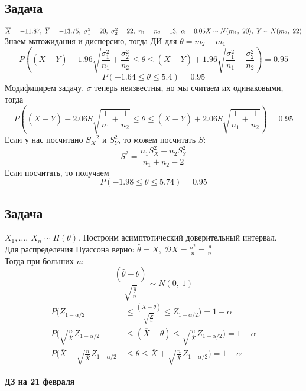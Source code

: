 \documentclass[12pt, a4paper]{article}
\newcommand{\dev}{\mathcal{D}}
\begin{document}
\subsection*{Задача}
$\overline{X} = -11.87,\ \overline{Y} = -13.75,\ \sigma_1^2 = 20,\ \sigma_2^2 = 22,\ n_1 = n_2 = 13,\ \alpha = 0.05\\
    X \sim N(m_1,\ 20),\ Y \sim N(m_2,\ 22)$
Знаем матожидания и дисперсию, тогда ДИ для $\theta = m_2 - m_1$
\[P \left( (\overline{X} - \overline{Y}) -1.96 \sqrt{\frac{\sigma_1^2}{n_1} + \frac{\sigma_2^2}{n_2}} \leq \theta \leq (\overline{X} - \overline{Y}) + 1.96 \sqrt{\frac{\sigma_1^2}{n_1} + \frac{\sigma_2^2}{n_2}} \right) = 0.95\]
\[P \left( -1.64 \leq \theta \leq 5.4 \right) = 0.95\]
Модифицирем задачу. $\sigma$ теперь неизвестны, но мы считаем их одинаковыми, тогда
\[P \left( (\overline{X} - \overline{Y}) -2.06 S \sqrt{\frac{1}{n_1} + \frac{1}{n_2}} \leq \theta \leq (\overline{X} - \overline{Y}) + 2.06 S \sqrt{\frac{1}{n_1} + \frac{1}{n_2}} \right) = 0.95\]
Если у нас посчитано ${S_{X}}^2$ и $S_Y^2$, то можем посчитать $S$:
\[S^2 = \frac{n_1 S_X^2 + n_2 S_Y^2}{n_1 + n_2 - 2}\]
Если посчитать, то получаем
\[P \left( -1.98 \leq \theta \leq 5.74 \right) = 0.95\]
\subsection*{Задача}
$X_1,\dots,\ X_n \sim \Pi(\theta)$. Построим асимптотический доверительный интервал.\\
Для распределения Пуассона верно: $\hat \theta = \overline{X},\ \dev \overline{X} = \frac{\sigma^2}{n} = \frac{\theta}{n}$\\
Тогда при больших $n$:
\[\frac{(\hat\theta - \theta)}{\sqrt{\frac{\hat\theta}{n}}} \sim N(0,\ 1)\]
\begin{equation*}
    \begin{aligned}
        P \Bigg( Z_{1 - \alpha/2}                                            & \,\leq  \frac{(\overline X - \theta)}{\sqrt{\frac{\overline X}{n}}} \leq Z_{1 - \alpha/2} \Bigg) = 1- \alpha \\
        P \Bigg( \sqrt{\frac{n}{\overline X}}Z_{1 - \alpha/2}                & \,\leq  {(\overline X - \theta)} \leq  \sqrt{\frac{n}{\overline X}}Z_{1 - \alpha/2} \Bigg) = 1- \alpha       \\
        P \Bigg( \overline{X} - \sqrt{\frac{n}{\overline X}}Z_{1 - \alpha/2} & \,\leq  \theta \leq  \overline{X} + \sqrt{\frac{n}{\overline X}}Z_{1 - \alpha/2} \Bigg) = 1- \alpha
    \end{aligned}
\end{equation*}
\begin{center}
    \bf ДЗ на 21 февраля
\end{center}
\end{document}
